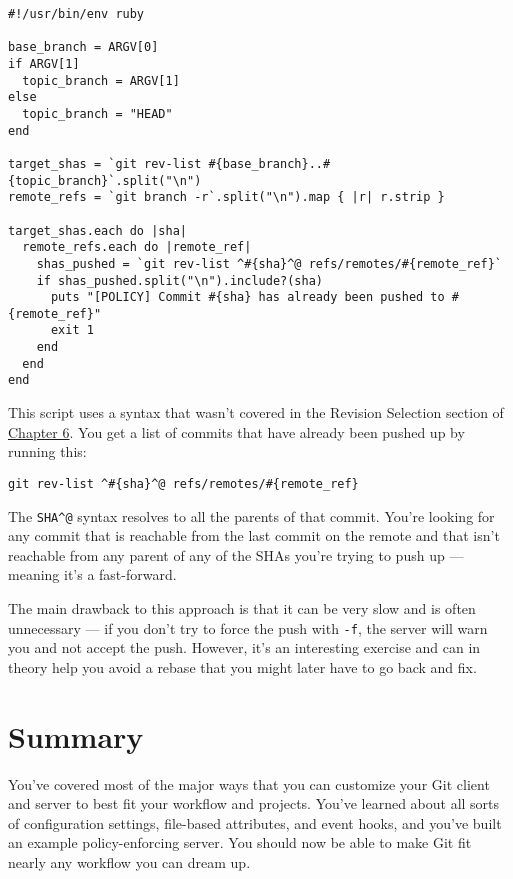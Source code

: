 \documentclass[a4paper]{book}
\newcommand{\prechap}{Chapter }
\newcommand{\postchap}{}
\newcommand{\chapref}[1]{\hyperref[chap:#1]{\prechap #1\postchap}}
\begin{document}
\begin{shaded}\begin{verbatim}
#!/usr/bin/env ruby

base_branch = ARGV[0]
if ARGV[1]
  topic_branch = ARGV[1]
else
  topic_branch = "HEAD"
end

target_shas = `git rev-list #{base_branch}..#{topic_branch}`.split("\n")
remote_refs = `git branch -r`.split("\n").map { |r| r.strip }

target_shas.each do |sha|
  remote_refs.each do |remote_ref|
    shas_pushed = `git rev-list ^#{sha}^@ refs/remotes/#{remote_ref}`
    if shas_pushed.split("\n").include?(sha)
      puts "[POLICY] Commit #{sha} has already been pushed to #{remote_ref}"
      exit 1
    end
  end
end
\end{verbatim}\end{shaded}

This script uses a syntax that wasn't covered in the Revision Selection section of \chapref{6}. You get a list of commits that have already been pushed up by running this:

\begin{shaded}\begin{verbatim}
git rev-list ^#{sha}^@ refs/remotes/#{remote_ref}
\end{verbatim}\end{shaded}

The \texttt{SHA\^{}@} syntax resolves to all the parents of that commit. You're looking for any commit that is reachable from the last commit on the remote and that isn't reachable from any parent of any of the SHAs you're trying to push up --- meaning it's a fast-forward.

The main drawback to this approach is that it can be very slow and is often unnecessary --- if you don't try to force the push with \texttt{-f}, the server will warn you and not accept the push. However, it's an interesting exercise and can in theory help you avoid a rebase that you might later have to go back and fix.

\section{Summary}

You've covered most of the major ways that you can customize your Git client and server to best fit your workflow and projects. You've learned about all sorts of configuration settings, file-based attributes, and event hooks, and you've built an example policy-enforcing server. You should now be able to make Git fit nearly any workflow you can dream up.
\end{document}
